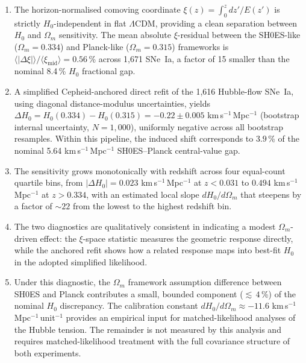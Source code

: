 \documentclass[fleqn,usenatbib,useAMS]{mnras}
\begin{document}
\begin{enumerate}

\item The horizon-normalised comoving coordinate
  $\xi(z) = \int_0^z dz'/E(z')$ is strictly $H_0$-independent
  in flat $\Lambda$CDM, providing a clean separation between
  $H_0$ and $\Omega_m$ sensitivity.
  The mean absolute $\xi$-residual between the SH0ES-like
  ($\Omega_m = 0.334$) and Planck-like ($\Omega_m = 0.315$)
  frameworks is
  $\langle|\Delta\xi|\rangle/\langle\xi_\mathrm{mid}\rangle = 0.56$\,\%
  across 1{,}671 SNe~Ia, a factor of 15 smaller than the
  nominal 8.4\,\% $H_0$ fractional gap.

\item A simplified Cepheid-anchored direct refit of the 1{,}616
  Hubble-flow SNe~Ia, using diagonal distance-modulus uncertainties,
  yields $\Delta H_0 = H_0(0.334) - H_0(0.315)
  = -0.22 \pm 0.005$ km\,s$^{-1}$\,Mpc$^{-1}$
  (bootstrap internal uncertainty, $N = 1{,}000$),
  uniformly negative across all bootstrap resamples.
  Within this pipeline, the induced shift corresponds to $3.9$\,\%
  of the nominal 5.64 km\,s$^{-1}$\,Mpc$^{-1}$ SH0ES--Planck
  central-value gap.

\item The sensitivity grows monotonically with redshift across
  four equal-count quartile bins, from
  $|\Delta H_0| = 0.023$ km\,s$^{-1}$\,Mpc$^{-1}$ at
  $z < 0.031$ to $0.494$ km\,s$^{-1}$\,Mpc$^{-1}$ at
  $z > 0.334$, with an estimated local slope
  $dH_0/d\Omega_m$ that steepens by a factor of
  ${\sim}22$ from the lowest to the highest redshift bin.

\item The two diagnostics are qualitatively consistent in indicating
  a modest $\Omega_m$-driven effect: the $\xi$-space statistic
  measures the geometric response directly, while the anchored
  refit shows how a related response maps into best-fit $H_0$ in
  the adopted simplified likelihood.

\item Under this diagnostic, the $\Omega_m$ framework assumption
  difference between SH0ES and Planck contributes a small, bounded
  component (${\lesssim}\,4$\,\%) of the nominal $H_0$ discrepancy.
  The calibration constant $dH_0/d\Omega_m \approx -11.6$
  km\,s$^{-1}$\,Mpc$^{-1}$\,unit$^{-1}$ provides an empirical
  input for matched-likelihood analyses of the Hubble tension.
  The remainder is not measured by this analysis and requires
  matched-likelihood treatment with the full covariance structure
  of both experiments.

\end{enumerate}
\end{document}
